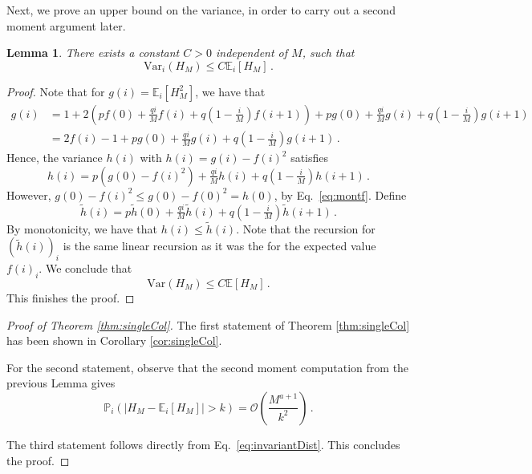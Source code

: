 \documentclass{article}
\numberwithin{equation}{section}
\newcommand{\ek}[1]{\left[#1\right]}
\newcommand{\rk}[1]{\left(#1\right)}
\newcommand{\abs}[1]{\left| #1 \right|}
\newcommand{\Ocal}   {{\mathcal O }}
\renewcommand{\P}   {\mathbb{P}}
\newcommand{\E}     {\mathbb{E}}
\newcommand{\1}{\mathbbm{1}}
\renewcommand{\P}{\mathbb{P}}
\newtheorem{lemma}{Lemma}[section]
\newcommand{\Var}{\mathrm{Var}}
\begin{document}
Next, we prove an upper bound on the variance, in order to carry out a second moment argument later.
\begin{lemma}
    There exists a constant $C>0$ independent of $M$, such that
    \begin{equation}
        \Var_i\rk{H_M}\le C\E_i\ek{H_M}\, .
    \end{equation}
\end{lemma}
\begin{proof}
    Note that for $g(i)=\E_i\ek{H_M^2}$, we have that
\begin{align}
    g(i)&=1+2\rk{pf(0)+\tfrac{qi}{M}f(i)+q\rk{1-\tfrac{i}{M}}f(i+1)}+pg(0)+\tfrac{qi}{M}g(i)+q\rk{1-\tfrac{i}{M}}g(i+1)\\
    &=2f(i)-1+pg(0)+\tfrac{qi}{M}g(i)+q\rk{1-\tfrac{i}{M}}g(i+1)\, .
\end{align}
Hence, the variance $h(i)$ with $h(i)=g(i)-f(i)^2$ satisfies
\begin{equation}
    h(i)=p\rk{g(0)-f(i)^2}+\tfrac{qi}{M}h(i)+q\rk{1-\tfrac{i}{M}}h(i+1)\, .
\end{equation}
However, $g(0)-f(i)^2\le g(0)-f(0)^2=h(0)$, by Eq.~\eqref{eq:montf}. Define
\begin{equation}
    \tilde{h}(i)=p\tilde{h}(0)+\tfrac{qi}{M}\tilde{h}(i)+q\rk{1-\tfrac{i}{M}}\tilde{h}(i+1)\, .
\end{equation}
By monotonicity, we have that $h(i)\le \tilde{h}(i)$. Note that the recursion for $\rk{\tilde{h}(i)}_i$ is the same linear recursion as it was the for the expected value $f(i)_i$. We conclude that
\begin{equation}
    \Var(H_M)\le C \E\ek{H_M}\, .
\end{equation}
This finishes the proof.
\end{proof}
\begin{proof}[Proof of Theorem \ref{thm:singleCol}]
    The first statement of Theorem \ref{thm:singleCol} has been shown in Corollary \ref{cor:singleCol}.
    
    For the second statement, observe that the second moment computation from the previous Lemma gives
    \begin{equation}
        \P_i\rk{\abs{H_M-\E_i\ek{H_M}}>k}=\Ocal\rk{\frac{M^{a+1}}{k^2}}\, .
    \end{equation}

    The third statement follows directly from Eq.~\eqref{eq:invariantDist}.
    This concludes the proof.
\end{proof}
\end{document}
